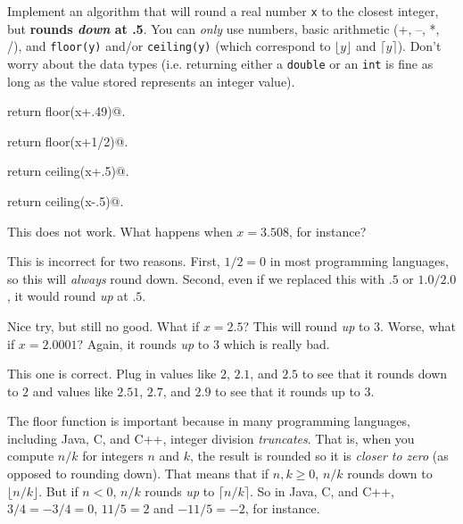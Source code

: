 \begin{eval}
Implement an algorithm that will round a real number \verb+x+ to the closest integer, 
but {\bf rounds {\em down} at .5}.
You can {\em only} use numbers, basic arithmetic (+, --, *, /), and \verb+floor(y)+ and/or 
\verb+ceiling(y)+ (which correspond to $\lfloor y \rfloor$ and $\lceil y\rceil$).
Don't worry about the data types (i.e. returning either a \verb+double+ or an \verb+int+ is fine
as long as the value stored represents an integer value).
\begin{ssolenum}
\item
\verb@ return floor(x+.49)@.\\
\evallinetwo
\item
\verb@ return floor(x+1/2)@.\\
\evallinetwo
\item
\verb@ return ceiling(x+.5)@.\\
\evallinetwo
\item
\verb@ return ceiling(x-.5)@.\\
\evallinetwo
\end{ssolenum}
\begin{answer}
\begin{solevalenum}
\item
This does not work.  What happens when $x=3.508$, for instance?
\item
This is incorrect for two reasons.  First, $1/2=0$ in most programming languages, so this
will {\em always} round down.
Second, even if we replaced this with $.5$ or $1.0/2.0$, it would round {\em up} at $.5$.
\item
Nice try, but still no good.  What if $x=2.5$?  This will round {\em up} to $3$.
Worse, what if $x=2.0001$?  Again, it rounds {\em up} to $3$ which is really bad.
\item
This one is correct.  Plug in values like $2$, $2.1$, and $2.5$ to see that it rounds down to
$2$ and values like $2.51$, $2.7$, and $2.9$ to see that it rounds up to $3$.
\end{solevalenum}
\end{answer}
\end{eval}




The floor function is important because in many programming languages, 
including Java, C, and C++, integer division {\em truncates}. That is, when you compute 
$n/k$ for integers $n$ and $k$, the result is rounded so it is {\em closer to zero} (as opposed to rounding down).
That means that if $n,k\geq 0$, $n/k$ rounds down to $\lfloor n/k\rfloor$.
But if $n<0$, $n/k$ rounds {\em up} to $\lceil n/k \rceil$.
So in Java, C, and C++, $3/4=-3/4=0$, $11/5=2$ and $-11/5=-2$, for instance.

